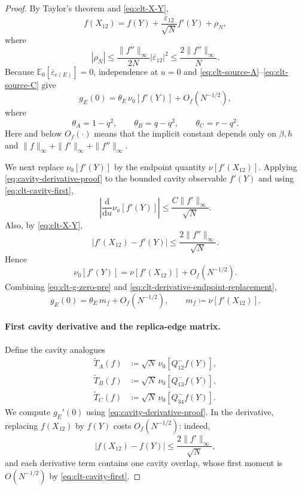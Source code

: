 \begin{proof}
By Taylor's theorem and \eqref{eq:clt-X-Y},
\[
 f(X_{12})
 =
 f(Y)
 +\frac{\overline\varepsilon_{12}}{\sqrt N}f'(Y)
 +\rho_N,
\]
where
\[
 |\rho_N|
 \le
 \frac{\|f''\|_\infty}{2N}
 |\overline\varepsilon_{12}|^2
 \le
 \frac{2\|f''\|_\infty}{N}.
\]
Because
$\mathbb E_0[\overline\varepsilon_{e(E)}]=0$, independence at $u=0$
and \eqref{eq:clt-source-A}--\eqref{eq:clt-source-C} give
\begin{equation}
 g_E(0)
 =
 \theta_E\,\nu_0[f'(Y)]
 +O_f(N^{-1/2}),
 \label{eq:clt-g-zero-pre}
\end{equation}
where
\begin{equation}
 \theta_A=1-q^2,
 \qquad
 \theta_B=q-q^2,
 \qquad
 \theta_C=r-q^2.
 \label{eq:clt-theta}
\end{equation}
Here and below $O_f(\cdot)$ means that the implicit constant depends only on
$\beta,h$ and
$\|f\|_\infty+\|f'\|_\infty+\|f''\|_\infty$.

We next replace $\nu_0[f'(Y)]$ by the endpoint quantity
$\nu[f'(X_{12})]$.  Applying \eqref{eq:cavity-derivative-proof} to the
bounded cavity observable $f'(Y)$ and using
\eqref{eq:clt-cavity-first},
\[
 \left|
 \frac{\mathrm d}{\mathrm du}\nu_u[f'(Y)]
 \right|
 \le
 \frac{C\|f'\|_\infty}{\sqrt N}.
\]
Also, by \eqref{eq:clt-X-Y},
\[
 |f'(X_{12})-f'(Y)|
 \le
 \frac{2\|f''\|_\infty}{\sqrt N}.
\]
Hence
\begin{equation}
 \nu_0[f'(Y)]
 =
 \nu[f'(X_{12})]+O_f(N^{-1/2}).
 \label{eq:clt-derivative-endpoint-replacement}
\end{equation}
Combining \eqref{eq:clt-g-zero-pre} and
\eqref{eq:clt-derivative-endpoint-replacement},
\begin{equation}
 g_E(0)
 =
 \theta_E\,m_f+O_f(N^{-1/2}),
 \qquad
 m_f\coloneqq\nu[f'(X_{12})].
 \label{eq:clt-g-zero}
\end{equation}

\paragraph{First cavity derivative and the replica-edge matrix.}
Define the cavity analogues
\begin{align}
 \widetilde T_A(f)
 &\coloneqq
 \sqrt N\,\nu_0[Q^-_{12}f(Y)],
 \label{eq:clt-Ttilde-A}\\
 \widetilde T_B(f)
 &\coloneqq
 \sqrt N\,\nu_0[Q^-_{13}f(Y)],
 \label{eq:clt-Ttilde-B}\\
 \widetilde T_C(f)
 &\coloneqq
 \sqrt N\,\nu_0[Q^-_{34}f(Y)].
 \label{eq:clt-Ttilde-C}
\end{align}
We compute $g_E'(0)$ using
\eqref{eq:cavity-derivative-proof}.  In the derivative, replacing
$f(X_{12})$ by $f(Y)$ costs $O_f(N^{-1/2})$: indeed,
\[
 |f(X_{12})-f(Y)|
 \le
 \frac{2\|f'\|_\infty}{\sqrt N},
\]
and each derivative term contains one cavity overlap, whose first moment is
$O(N^{-1/2})$ by \eqref{eq:clt-cavity-first}.


\end{proof}
